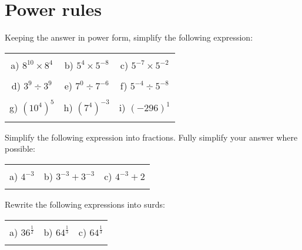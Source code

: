 \documentclass[12pt]{article}
\begin{document}
\section{Power rules}
Keeping the answer in power form, simplify the following expression:
\begin{table}[h!]
\centering
\begin{tabular}{c c c}
\hspace{5cm} & \hspace{5cm} & \hspace{5cm} \\
a) ${8}^{10}\times{8}^{4}$ & b) ${5}^{4}\times{5}^{-8}$ & c) ${5}^{-7}\times{5}^{-2}$ \\ \\
d) ${3}^{9}\div{3}^{9}$ & e) ${7}^{0}\div{7}^{-6}$ & f) ${5}^{-4}\div{5}^{-8}$ \\ \\
g) $({10}^{4})^{5}$ & h) $({7}^{4})^{-3}$ & i) $({-296})^1$ \\ \\
\end{tabular}
\end{table}
\newline
Simplify the following expression into fractions. Fully simplify your answer where possible:
\begin{table}[h!]
\centering
\begin{tabular}{c c c}
\hspace{5cm} & \hspace{5cm} & \hspace{5cm} \\
a) ${4}^{-3}$ & b) ${3}^{-3} + {3}^{-3}$ & c) ${4}^{-3} + {2}$ \\ \\
\end{tabular}
\end{table}
\newline
Rewrite the following expressions into surds:
\begin{table}[h!]
\centering
\begin{tabular}{c c c}
\hspace{5cm} & \hspace{5cm} & \hspace{5cm} \\
a) ${36}^\frac{1}{{2}}$ & b) ${64}^\frac{1}{{3}}$ & c) ${64}^\frac{1}{{3}}$ \\ \\
\end{tabular}
\end{table}
\newline
\newpage
\end{document}
